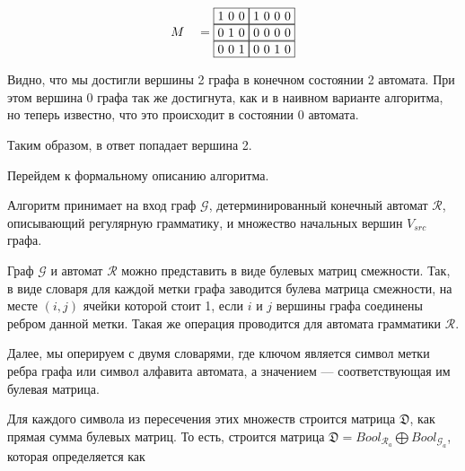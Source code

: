 \begin{example}
\begin{alignat*}{7}
  & &&M &&=\begin{matrix}
    \fbox{1 0 0} \fbox{1 0 0 0} \\ 
    \fbox{0 1 0} \fbox{0 0 0 0} \\
    \fbox{0 0 1} \fbox{0 0 1 0}
        \end{matrix}
\end{alignat*}

Видно, что мы достигли вершины 2 графа в конечном состоянии 2 автомата. При этом вершина 0 графа так же достигнута, как и в наивном варианте алгоритма, но
теперь известно, что это происходит в состоянии 0 автомата.

\begin{center}
  \label{input_rpq}
\end{center}

Таким образом, в ответ попадает вершина 2.
\end{example}

Перейдем к формальному описанию алгоритма.


Алгоритм принимает на вход граф $\mathcal{G}$, детерминированный конечный автомат $\mathcal{R}$, описывающий регулярную грамматику, и множество начальных вершин $V_{src}$ графа.

Граф $\mathcal{G}$ и автомат $\mathcal{R}$ можно представить в виде булевых матриц смежности. Так, в виде словаря для каждой метки графа заводится булева матрица смежности, на месте $(i, j)$ ячейки которой стоит 1, если $i$ и $j$ вершины графа соединены ребром данной метки. Такая же операция проводится для автомата грамматики $\mathcal{R}$.

Далее, мы оперируем с двумя словарями, где ключом является символ метки ребра графа или символ алфавита автомата, а значением --- соответствующая им булевая матрица.

Для каждого символа из пересечения этих множеств строится матрица $\mathfrak{D}$, как прямая сумма булевых матриц. То есть, строится матрица $\mathfrak{D} = Bool_{\mathcal{R}_a} \bigoplus Bool_{\mathcal{G}_a}$, которая определяется как

